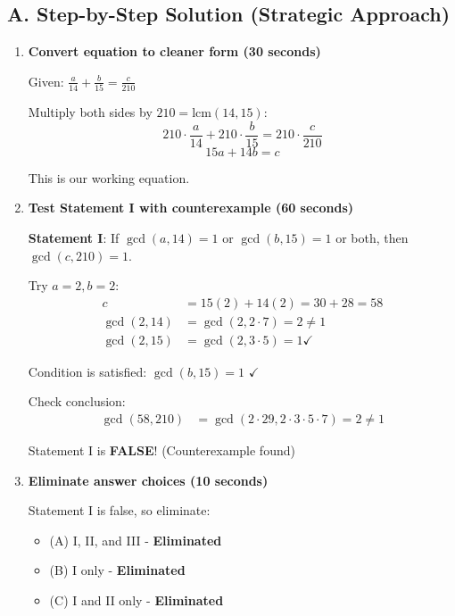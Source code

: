 \documentclass[12pt]{article}
\begin{document}
\begin{solutionbox}
\subsection*{A. Step-by-Step Solution (Strategic Approach)}

\begin{enumerate}[leftmargin=*]
    \item \textbf{Convert equation to cleaner form (30 seconds)}
    
    Given: $\frac{a}{14}+\frac{b}{15}=\frac{c}{210}$
    
    Multiply both sides by $210 = \text{lcm}(14, 15)$:
    $$210 \cdot \frac{a}{14} + 210 \cdot \frac{b}{15} = 210 \cdot \frac{c}{210}$$
    $$15a + 14b = c$$
    
    This is our working equation.
    
    \item \textbf{Test Statement I with counterexample (60 seconds)}
    
    \textbf{Statement I}: If $\gcd(a,14)=1$ or $\gcd(b,15)=1$ or both, then $\gcd(c,210)=1$.
    
    Try $a=2, b=2$:
    \begin{align*}
        c &= 15(2) + 14(2) = 30 + 28 = 58\\
        \gcd(2, 14) &= \gcd(2, 2 \cdot 7) = 2 \neq 1\\
        \gcd(2, 15) &= \gcd(2, 3 \cdot 5) = 1 \checkmark
    \end{align*}
    
    Condition is satisfied: $\gcd(b,15)=1$ $\checkmark$
    
    Check conclusion:
    \begin{align*}
        \gcd(58, 210) &= \gcd(2 \cdot 29, 2 \cdot 3 \cdot 5 \cdot 7) = 2 \neq 1
    \end{align*}
    
    Statement I is \textbf{FALSE}! (Counterexample found)
    
    \item \textbf{Eliminate answer choices (10 seconds)}
    
    Statement I is false, so eliminate:
    \begin{itemize}
        \item (A) I, II, and III - \textbf{Eliminated}
        \item (B) I only - \textbf{Eliminated}
        \item (C) I and II only - \textbf{Eliminated}
    \end{itemize}
    

\end{enumerate}
\end{solutionbox}
\end{document}
